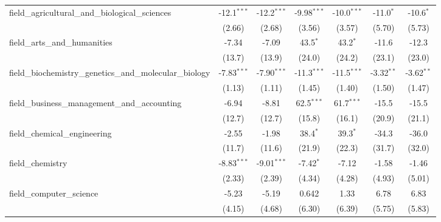 \begin{tabular}{lcccccc}
   field\_agricultural\_and\_biological\_sciences              & -12.1$^{***}$ & -12.2$^{***}$ & -9.98$^{***}$ & -10.0$^{***}$ & -11.0$^{*}$   & -10.6$^{*}$\\   
                                                               & (2.66)        & (2.68)        & (3.56)        & (3.57)        & (5.70)        & (5.73)\\   
   field\_arts\_and\_humanities                                & -7.34         & -7.09         & 43.5$^{*}$    & 43.2$^{*}$    & -11.6         & -12.3\\   
                                                               & (13.7)        & (13.9)        & (24.0)        & (24.2)        & (23.1)        & (23.0)\\   
   field\_biochemistry\_genetics\_and\_molecular\_biology      & -7.83$^{***}$ & -7.90$^{***}$ & -11.3$^{***}$ & -11.5$^{***}$ & -3.32$^{**}$  & -3.62$^{**}$\\   
                                                               & (1.13)        & (1.11)        & (1.45)        & (1.40)        & (1.50)        & (1.47)\\   
   field\_business\_management\_and\_accounting                & -6.94         & -8.81         & 62.5$^{***}$  & 61.7$^{***}$  & -15.5         & -15.5\\   
                                                               & (12.7)        & (12.7)        & (15.8)        & (16.1)        & (20.9)        & (21.1)\\   
   field\_chemical\_engineering                                & -2.55         & -1.98         & 38.4$^{*}$    & 39.3$^{*}$    & -34.3         & -36.0\\   
                                                               & (11.7)        & (11.6)        & (21.9)        & (22.3)        & (31.7)        & (32.0)\\   
   field\_chemistry                                            & -8.83$^{***}$ & -9.01$^{***}$ & -7.42$^{*}$   & -7.12         & -1.58         & -1.46\\   
                                                               & (2.33)        & (2.39)        & (4.34)        & (4.28)        & (4.93)        & (5.01)\\   
   field\_computer\_science                                    & -5.23         & -5.19         & 0.642         & 1.33          & 6.78          & 6.83\\   
                                                               & (4.15)        & (4.68)        & (6.30)        & (6.39)        & (5.75)        & (5.83)\\   

\end{tabular}
